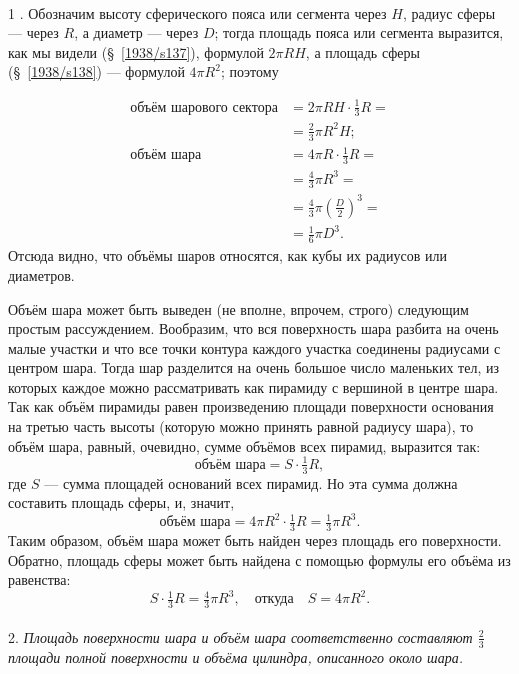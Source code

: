 \paragraph{}\label{1938/s145}
 1 .
Обозначим высоту сферического пояса или сегмента через $H$, радиус сферы — через $R$, а диаметр — через $D$;
тогда площадь пояса или сегмента выразится, как мы видели (§~\ref{1938/s137}), формулой $2\pi RH$, а площадь сферы (§~\ref{1938/s138}) — формулой $4\pi R^2$;
поэтому

\begin{align*}
\text{объём шарового сектора}&= 2\pi RH\cdot \tfrac13 R =
\\
&= \tfrac23 \pi R^2 H;
\\
\text{объём шара} &= 4\pi R\cdot \tfrac13 R = 
\\
&=\tfrac43\pi R^3=
\\
&= \tfrac43\pi\left(\frac D2\right)^3=
\\
&= \tfrac16\pi D^3.
\end{align*}
Отсюда видно, что объёмы шаров относятся, как кубы их радиусов или диаметров.

Объём шара может быть выведен (не вполне, впрочем, строго) следующим простым рассуждением.
Вообразим, что вся поверхность шара разбита на очень малые участки и что все точки контура каждого участка соединены радиусами с центром шара.
Тогда шар разделится на очень большое число маленьких тел, из которых каждое можно рассматривать как пирамиду с вершиной в центре шара.
Так как объём пирамиды равен произведению площади поверхности основания на третью часть высоты (которую можно принять равной радиусу шара), то объём шара, равный, очевидно, сумме объёмов всех пирамид, выразится так:
\[\text{объём шара} = S \cdot \tfrac13 R,\]
где $S$ — сумма площадей оснований всех пирамид.
Но эта сумма должна составить площадь сферы, и, значит,
\[\text{объём шара} = 4\pi R^2\cdot \tfrac13 R = \tfrac13 \pi R^3.\]
Таким образом, объём шара может быть найден через площадь его поверхности.
Обратно, площадь сферы может быть найдена с помощью формулы его объёма из равенства:
\[S\cdot \tfrac13 R = \tfrac43 \pi R^3,\quad\text{откуда}\quad S = 4\pi R^2.\]

\paragraph{}\label{1938/s146}
 2.
\emph{Площадь поверхности шара и объём шара соответственно составляют $\tfrac23$ площади полной поверхности и объёма цилиндра, описанного около шара.}

